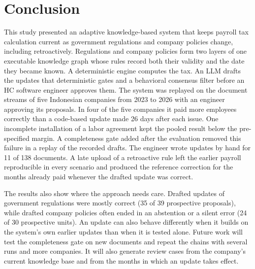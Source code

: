 \section{Conclusion}
\label{sec:conclusion}
This study presented an adaptive knowledge-based system that keeps payroll tax calculation current as government regulations and company policies change, including retroactively. Regulations and company policies form two layers of one executable knowledge graph whose rules record both their validity and the date they became known. A deterministic engine computes the tax. An LLM drafts the updates that deterministic gates and a behavioral consensus filter before an HC software engineer approves them. The system was replayed on the document streams of five Indonesian companies from 2023 to 2026 with an engineer approving its proposals. In four of the five companies it paid more employees correctly than a code-based update made 26 days after each issue. One incomplete installation of a labor agreement kept the pooled result below the pre-specified margin. A completeness gate added after the evaluation removed this failure in a replay of the recorded drafts. The engineer wrote updates by hand for 11 of 138 documents. A late upload of a retroactive rule left the earlier payroll reproducible in every scenario and produced the reference correction for the months already paid whenever the drafted update was correct.

The results also show where the approach needs care. Drafted updates of government regulations were mostly correct (35 of 39 prospective proposals), while drafted company policies often ended in an abstention or a silent error (24 of 30 prospective units). An update can also behave differently when it builds on the system's own earlier updates than when it is tested alone. Future work will test the completeness gate on new documents and repeat the chains with several runs and more companies. It will also generate review cases from the company's current knowledge base and from the months in which an update takes effect.
